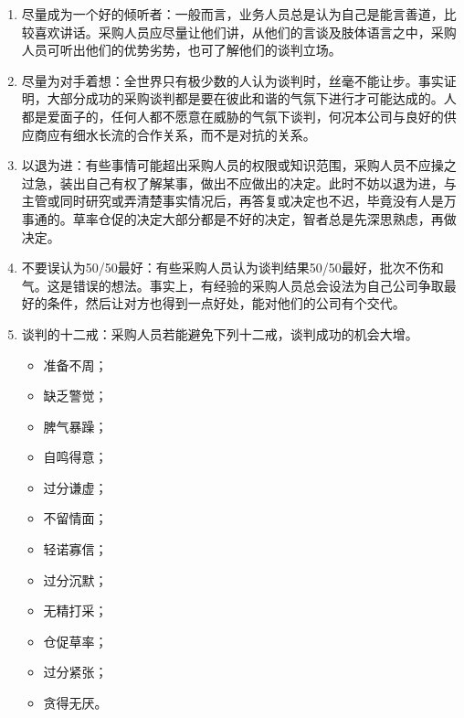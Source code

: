 \begin{enumerate}
        \item 尽量成为一个好的倾听者：一般而言，业务人员总是认为自己是能言善道，比较喜欢讲话。采购人员应尽量让他们讲，从他们的言谈及肢体语言之中，采购人员可听出他们的优势劣势，也可了解他们的谈判立场。

        \item 尽量为对手着想：全世界只有极少数的人认为谈判时，丝毫不能让步。事实证明，大部分成功的采购谈判都是要在彼此和谐的气氛下进行才可能达成的。人都是爱面子的，任何人都不愿意在威胁的气氛下谈判，何况本公司与良好的供应商应有细水长流的合作关系，而不是对抗的关系。

        \item 以退为进：有些事情可能超出采购人员的权限或知识范围，采购人员不应操之过急，装出自己有权了解某事，做出不应做出的决定。此时不妨以退为进，与主管或同时研究或弄清楚事实情况后，再答复或决定也不迟，毕竟没有人是万事通的。草率仓促的决定大部分都是不好的决定，智者总是先深思熟虑，再做决定。

        \item 不要误认为50/50最好：有些采购人员认为谈判结果50/50最好，批次不伤和气。这是错误的想法。事实上，有经验的采购人员总会设法为自己公司争取最好的条件，然后让对方也得到一点好处，能对他们的公司有个交代。

        \item 谈判的十二戒：采购人员若能避免下列十二戒，谈判成功的机会大增。
            \begin{itemize}
                \item 准备不周；\item 缺乏警觉；\item 脾气暴躁；\item 自鸣得意；\item 过分谦虚；\item 不留情面；\item 轻诺寡信；\item 过分沉默；\item 无精打采；\item 仓促草率；\item 过分紧张；\item 贪得无厌。
            \end{itemize}

    \end{enumerate}


